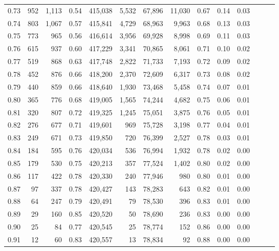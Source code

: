 \begin{tabular}{rrrrrrrrrrrrrr}
0.73 &    952 &  1,113 &  0.54 &  415,038 &    5,532 &  67,896 &  11,030 &  0.67 &  0.14 &      0.03 \\
0.74 &    803 &  1,067 &  0.57 &  415,841 &    4,729 &  68,963 &   9,963 &  0.68 &  0.13 &      0.03 \\
0.75 &    773 &    965 &  0.56 &  416,614 &    3,956 &  69,928 &   8,998 &  0.69 &  0.11 &      0.03 \\
0.76 &    615 &    937 &  0.60 &  417,229 &    3,341 &  70,865 &   8,061 &  0.71 &  0.10 &      0.02 \\
0.77 &    519 &    868 &  0.63 &  417,748 &    2,822 &  71,733 &   7,193 &  0.72 &  0.09 &      0.02 \\
0.78 &    452 &    876 &  0.66 &  418,200 &    2,370 &  72,609 &   6,317 &  0.73 &  0.08 &      0.02 \\
0.79 &    440 &    859 &  0.66 &  418,640 &    1,930 &  73,468 &   5,458 &  0.74 &  0.07 &      0.01 \\
0.80 &    365 &    776 &  0.68 &  419,005 &    1,565 &  74,244 &   4,682 &  0.75 &  0.06 &      0.01 \\
0.81 &    320 &    807 &  0.72 &  419,325 &    1,245 &  75,051 &   3,875 &  0.76 &  0.05 &      0.01 \\
0.82 &    276 &    677 &  0.71 &  419,601 &      969 &  75,728 &   3,198 &  0.77 &  0.04 &      0.01 \\
0.83 &    249 &    671 &  0.73 &  419,850 &      720 &  76,399 &   2,527 &  0.78 &  0.03 &      0.01 \\
0.84 &    184 &    595 &  0.76 &  420,034 &      536 &  76,994 &   1,932 &  0.78 &  0.02 &      0.00 \\
0.85 &    179 &    530 &  0.75 &  420,213 &      357 &  77,524 &   1,402 &  0.80 &  0.02 &      0.00 \\
0.86 &    117 &    422 &  0.78 &  420,330 &      240 &  77,946 &     980 &  0.80 &  0.01 &      0.00 \\
0.87 &     97 &    337 &  0.78 &  420,427 &      143 &  78,283 &     643 &  0.82 &  0.01 &      0.00 \\
0.88 &     64 &    247 &  0.79 &  420,491 &       79 &  78,530 &     396 &  0.83 &  0.01 &      0.00 \\
0.89 &     29 &    160 &  0.85 &  420,520 &       50 &  78,690 &     236 &  0.83 &  0.00 &      0.00 \\
0.90 &     25 &     84 &  0.77 &  420,545 &       25 &  78,774 &     152 &  0.86 &  0.00 &      0.00 \\
0.91 &     12 &     60 &  0.83 &  420,557 &       13 &  78,834 &      92 &  0.88 &  0.00 &      0.00 \\

\end{tabular}
